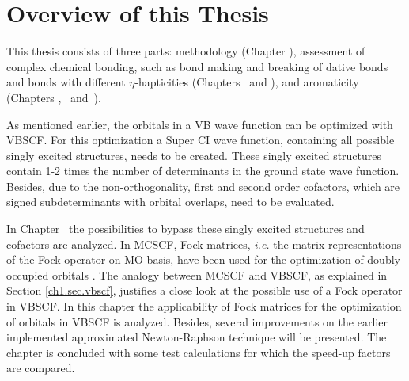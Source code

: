\section{Overview of this Thesis}

This thesis consists of three parts: methodology (Chapter \chorbopt), assessment of complex chemical bonding, such as bond making and breaking of dative bonds and bonds with different $\eta$-hapticities (Chapters \chdissociation\ and \chcyclopentadienyl), and aromaticity (Chapters \chhuckel, \chinorganic\ and~\chindacene).

As mentioned earlier, the orbitals in a VB wave function can be optimized with \mbox{VBSCF}. For this optimization a Super CI wave function, containing all possible singly excited structures,  needs to be created. These singly excited structures contain 1-2 times the number of determinants in the ground state wave function. Besides, due to the non-orthogonality, first and second order cofactors, which are signed subdeterminants with orbital overlaps, need to be evaluated.

In Chapter \chorbopt\ the possibilities to bypass these singly excited structures and cofactors are analyzed. In MCSCF, Fock matrices, \textit{i.e.} the matrix representations of the Fock operator on MO basis, have been used for the optimization of doubly occupied orbitals \cite{roos1,roos2}. The analogy between MCSCF and VBSCF, as explained in Section \ref{ch1.sec.vbscf}, justifies a close look at the possible use of a Fock operator in VBSCF. In this chapter the applicability of Fock matrices for the optimization of orbitals in VBSCF is analyzed. Besides, several improvements on the earlier implemented approximated Newton-Raphson technique \cite{koos1} will be presented. The chapter is concluded with some test calculations for which the speed-up factors are compared.

